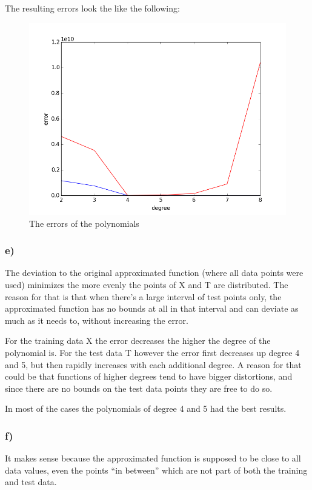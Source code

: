 The resulting errors look the like the following:

\newpage

\begin{figure}[!ht]
\includegraphics[width=1\textwidth]{chapters/images/figure-5-11-d}
\caption{The errors of the polynomials}
\end{figure}


\subsubsection{e)}

The deviation to the original approximated function (where all data points were used) minimizes the more evenly the points of X and T are distributed. The reason for that is that when there's a large interval of test points only, the approximated function has no bounds at all in that interval and can deviate as much as it needs to, without increasing the error.

For the training data X the error decreases the higher the degree of the polynomial is. For the test data T however the error first decreases up degree 4 and 5, but then 
rapidly increases with each additional degree. A reason for that could be that functions of higher degrees tend to have bigger distortions, and since there are no bounds on the test data points they are free to do so.

In most of the cases the polynomials of degree 4 and 5 had the best results.


\subsubsection{f)}

It makes sense because the approximated function is supposed to be close to all data values, even the points \enquote{in between} which are not part of both the training and test data.